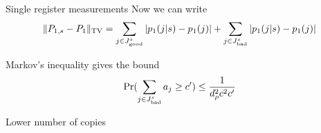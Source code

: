 \documentclass[final,slideColor,nototal,colorBG,pdf,simple]{prosper}
\newcommand{\bs}{\begin{slide}}
\newcommand{\es}{\end{slide}}
\newcommand{\<}{\langle}
\renewcommand{\>}{\rangle}
\begin{document}
\bs{Single register measurements}
Now we can write 
\[
\|P_{1,s}-P_1\|_{\rm TV}=
\sum_{j\in J^s_{\rm good}} |p_1(j|s)-p_1(j)| +
\sum_{j\in J^s_{\rm bad}}  |p_1(j|s)-p_1(j)|
\]

\bigskip
Markov's inequality gives the bound
\[
{\rm Pr}(\sum_{j\in J^s_{\rm bad}} a_j\ge c') \le 
\frac{1}{d_\rho^2 c^2 c'}
\]
\es


\bs{Lower number of copies}

\es

\end{document}
